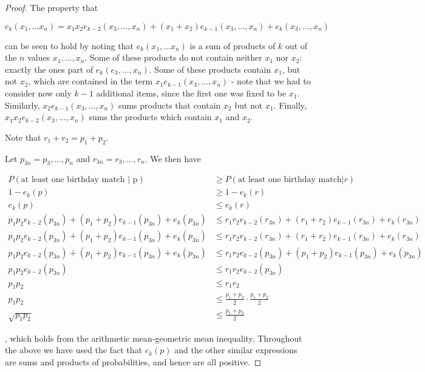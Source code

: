 \begin{proof}
    The property that
    
    $$e_k(x_1, \dots x_n) = x_1x_2e_{k-2}(x_3, \dots, x_n) + (x_1+x_2)e_{k-1}(x_3, \dots, x_n) + e_k(x_3, \dots, x_n)$$

    can be seen to hold by noting that $e_k(x_1, \dots x_n)$ is a sum of products of $k$ out of the $n$ values $x_1, \dots, x_n$. Some of these products do not contain neither $x_1$ nor $x_2$: exactly the ones part of $e_k(e_3, \dots, x_n)$. Some of these products contain $x_1$, but not $x_2$, which are contained in the term $x_1e_{k-1}(x_3, \dots, x_n)$ - note that we had to consider now only $k-1$ additional items, since the first one was fixed to be $x_1$. Similarly, $x_2e_{k-1}(x_3, \dots, x_n)$ sums products that contain $x_2$ but not $x_1$. Finally, $x_1x_2e_{k-2}(x_3, \dots, x_n)$ sums the products which contain $x_1$ and $x_2$.

    Note that $r_1+r_2 = p_1+p_2$. 

    Let $p_{3n} = p_3, \dots, p_n$ and $r_{3n} = r_3, \dots, r_n$. We then have

    \begin{align*}
    P(\text{at least one birthday match | p}) &\geq P(\text{at least one birthday match}|r) \\
    1 - e_k(p) &\geq 1-e_k(r) \\
     e_k(p) &\leq e_k(r) \\
    p_1p_2e_{k-2}(p_{3n}) + (p_1+p_2)e_{k-1}(p_{3n}) + e_k(p_{3n}) &\leq r_1r_2e_{k-2}(r_{3n}) + (r_1+r_2)e_{k-1}(r_{3n}) + e_k(r_{3n}) \\
    p_1p_2e_{k-2}(p_{3n}) + (p_1+p_2)e_{k-1}(p_{3n}) + e_k(p_{3n}) &\leq r_1r_2e_{k-2}(r_{3n}) + (r_1+r_2)e_{k-1}(r_{3n}) + e_k(r_{3n}) \\
    p_1p_2e_{k-2}(p_{3n}) + (p_1+p_2)e_{k-1}(p_{3n}) + e_k(p_{3n}) &\leq r_1r_2e_{k-2}(p_{3n}) + (p_1+p_2)e_{k-1}(p_{3n}) + e_k(p_{3n}) \\
    p_1p_2e_{k-2}(p_{3n}) &\leq r_1r_2e_{k-2}(p_{3n}) \\
    p_1p_2 &\leq r_1r_2 \\
    p_1p_2 &\leq \frac{p_1+p_2}{2} \cdot \frac{p_1+p_2}{2} \\
    \sqrt{p_1p_2} &\leq \frac{p_1+p_2}{2}
    \end{align*}

    , which holds from the arithmetic mean-geometric mean inequality. Throughout the above we have used the fact that $e_k(p)$ and the other similar expressions are sums and products of probabilities, and hence are all positive.
    
\end{proof}

